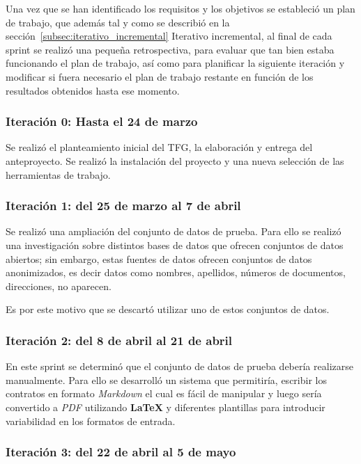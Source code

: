 Una vez que se han identificado los requisitos y los objetivos se estableció un plan de trabajo, que además tal y como
se describió en la sección~\ref{subsec:iterativo_incremental} Iterativo incremental, al final de cada sprint se realizó
una pequeña retrospectiva, para evaluar que tan bien estaba funcionando el plan de trabajo, así como para planificar
la siguiente iteración y modificar si fuera necesario el plan de trabajo restante en función de los resultados obtenidos
hasta ese momento.

\subsubsection{Iteración 0: Hasta el 24 de marzo}

Se realizó el planteamiento inicial del TFG, la elaboración y entrega del anteproyecto.
Se realizó la instalación del proyecto y una nueva selección de las herramientas de trabajo.

\subsubsection{Iteración 1: del 25 de marzo al 7 de abril}

Se realizó una ampliación del conjunto de datos de prueba.
Para ello se realizó una investigación sobre distintos bases de datos que ofrecen conjuntos de datos abiertos; sin
embargo, estas fuentes de datos ofrecen conjuntos de datos anonimizados, es decir datos como nombres, apellidos,
números de documentos, direcciones, no aparecen.

Es por este motivo que se descartó utilizar uno de estos conjuntos de datos.

\subsubsection{Iteración 2: del 8 de abril al 21 de abril}

En este sprint se determinó que el conjunto de datos de prueba debería realizarse manualmente.
Para ello se desarrolló un sistema que permitiría, escribir los contratos en formato \textit{Markdown} el cual es fácil
de manipular y luego sería convertido a \textit{PDF} utilizando \textbf{LaTeX} y diferentes plantillas para introducir
variabilidad en los formatos de entrada.

\subsubsection{Iteración 3: del 22 de abril al 5 de mayo}

